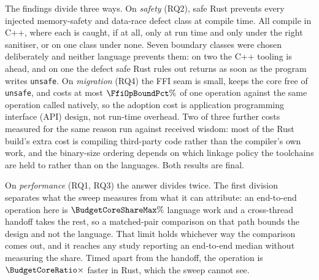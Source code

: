 The findings divide three ways. On \emph{safety} (RQ2), safe Rust prevents every injected
memory-safety and data-race defect class at compile time. All compile in C++, where each is
caught, if at all, only at run time and only under the right sanitiser, or on one class under
none. Seven boundary classes were chosen deliberately and neither language prevents them: on two
the C++ tooling is ahead, and on one the defect safe Rust rules out returns as soon as the
program writes \texttt{unsafe}. On \emph{migration} (RQ4) the FFI seam is small, keeps the core
free of \texttt{unsafe}, and costs at most $\FfiOpBoundPct\%$ of one operation against the same
operation called natively, so the adoption cost is application programming interface (API)
design, not run-time overhead. Two of three further costs measured for the same reason run
against received wisdom: most of the Rust build's extra cost is compiling third-party code rather
than the compiler's own work, and the binary-size ordering depends on which linkage policy the
toolchains are held to rather than on the languages. Both results are final.

On \emph{performance} (RQ1, RQ3) the answer divides twice. The first division separates what the
sweep measures from what it can attribute: an end-to-end operation here is
$\BudgetCoreShareMax\%$ language work and a cross-thread handoff takes the rest, so a
matched-pair comparison on that path bounds the design and not the language. That limit holds
whichever way the comparison comes out, and it reaches any study reporting an end-to-end median
without measuring the share. Timed apart from the handoff, the operation is
$\BudgetCoreRatio\times$ faster in Rust, which the sweep cannot see.

